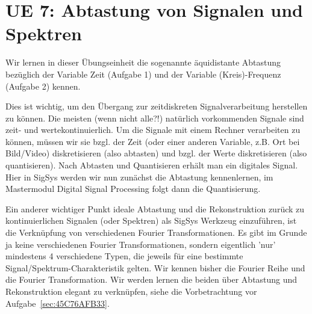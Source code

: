 \clearpage
\section{UE 7: Abtastung von Signalen und Spektren}

Wir lernen in dieser Übungseinheit die sogenannte äquidistante Abtastung bezüglich
der Variable Zeit (Aufgabe 1) und der Variable (Kreis)-Frequenz (Aufgabe 2) kennen.
%

Dies ist wichtig, um den Übergang zur zeitdiskreten Signalverarbeitung
herstellen zu können.
%
Die meisten (wenn nicht alle?!) natürlich vorkommenden Signale sind zeit- und
wertekontinuierlich.
%
Um die Signale mit einem Rechner verarbeiten zu können, müssen wir sie bzgl. der
Zeit (oder einer anderen Variable, z.B. Ort bei Bild/Video)
diskretisieren (also abtasten) und bzgl. der Werte diskretisieren
(also quantisieren).
%
Nach Abtasten und Quantisieren erhält man ein digitales Signal.
%
Hier in SigSys werden wir nun zunächst die Abtastung kennenlernen, im Mastermodul
Digital Signal Processing folgt dann die Quantisierung.
%

Ein anderer wichtiger Punkt ideale Abtastung und die Rekonstruktion zurück
zu kontinuierlichen Signalen (oder Spektren) als SigSys Werkzeug einzuführen, ist
die Verknüpfung von verschiedenen Fourier Transformationen.
%
Es gibt im Grunde ja keine verschiedenen Fourier Transformationen, sondern
eigentlich 'nur' mindestens 4 verschiedene Typen, die jeweils für eine bestimmte
Signal/Spektrum-Charakteristik gelten.
%
Wir kennen bisher die Fourier Reihe und die Fourier Transformation.
%
Wir werden lernen die beiden über Abtastung und Rekonstruktion elegant zu
verknüpfen, siehe die Vorbetrachtung vor Aufgabe~\ref{sec:45C76AFB33}.


